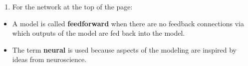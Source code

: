 \documentclass[12pt,letterpaper,noanswers]{exam}
\begin{document}
\begin{enumerate}[resume=classQ]
\item For the network at the top of the page:
\end{enumerate}

\begin{tcolorbox}
\begin{itemize}
\itemsep0pt
    \item A model is called \textbf{feedforward} when there are no feedback connections via which outputs of the model are fed back into the model.
    
    \item The term \textbf{neural} is used because aspects of the modeling are inspired by ideas from neuroscience.
\end{itemize}
\end{tcolorbox}

\renewcommand{\inputnum}{2} 
\renewcommand{\hiddennum}{2}  
\renewcommand{\outputnum}{1} 
 
\end{document}
